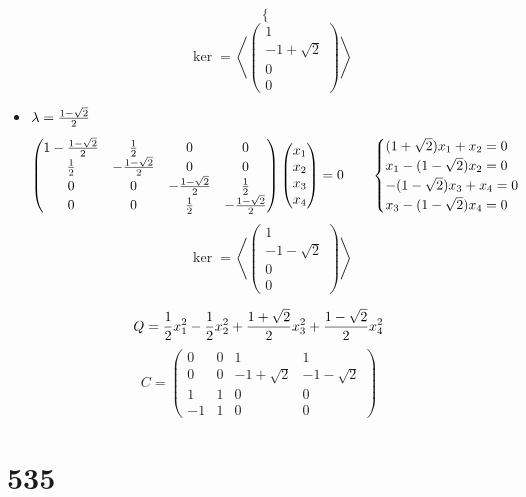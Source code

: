 \begin{itemize}
$$\begin{cases}
    \end{cases} $$
    $$ \ker = \left\langle
    \begin{pmatrix}
    	1 \\
        -1 + \sqrt2 \\
        0 \\
        0
    \end{pmatrix} \right\rangle $$
    \item $ \lambda = \half[1 - \sqrt2] $
    $$
    \begin{pmatrix}
        1 - \half[1 - \sqrt{2}] & \half & 0 & 0 \\
        \half & -\half[1 - \sqrt{2}] & 0 & 0 \\
        0 & 0 & -\half[1 - \sqrt{2}] & \half \\
        0 & 0 & \half & -\half[1 - \sqrt{2}]
    \end{pmatrix}
    \begin{pmatrix}
    	x_1 \\
        x_2 \\
        x_3 \\
        x_4
    \end{pmatrix} = 0 \qquad
    \begin{cases}
    	(1 + \sqrt2)x_1 + x_2 = 0 \\
        x_1 - (1 - \sqrt2)x_2 = 0 \\
        -(1 - \sqrt2)x_3 + x_4 = 0 \\
        x_3 - (1 - \sqrt2)x_4 = 0
    \end{cases} $$
    $$ \ker = \left\langle
    \begin{pmatrix}
    	1 \\
        -1 - \sqrt2 \\
        0 \\
        0
    \end{pmatrix} \right\rangle $$
\end{itemize}
$$ Q = \half x_1^2 - \half x_2^2 + \half[1 + \sqrt2]x_3^2 + \half[1 - \sqrt2]x_4^2 $$
$$ C =
\begin{pmatrix}
	0 & 0 & 1 & 1 \\
    0 & 0 & -1 + \sqrt2 & -1 - \sqrt2 \\
    1 & 1 & 0 & 0 \\
    -1 & 1 & 0 & 0
\end{pmatrix} $$

\section{535}

